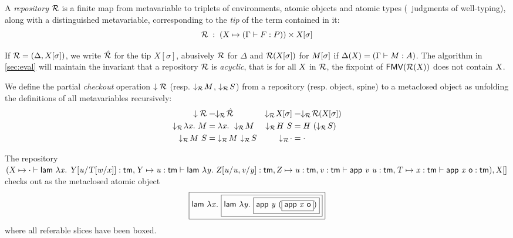 \documentclass{llncs}
\begin{document}


\begin{definition}
  A \emph{repository} $\mathcal{R}$ is a finite map from metavariable to
  triplets of environments, atomic objects and atomic types (\ie\
  judgments of well-typing), along with a distinguished metavariable,
  corresponding to the \emph{tip} of the term contained in it:
$$ \mathcal{R}\;:\;(\text{\textsl{X}} \mapsto (\Gamma\vdash{F}:{P}))\times{\ensuremath{\text{\textsl{X}}}}[{\sigma}] $$
\end{definition}

If $\mathcal{R} = (\Delta, X[\sigma])$, we write $\hat {\mathcal{R}}$ for the tip
$X[\sigma]$, abusively $\mathcal{R}$ for $\Delta$ and $\mathcal{R} ({\text{\textsl{X}}}[{\sigma}])$
for ${M}[{\sigma}]$ if $\Delta(\text{\textsl{X}}) = (\Gamma\vdash M : A)$.
The algorithm in \ref{sec:eval} will maintain the invariant that a
repository $\mathcal{R}$ is \emph{acyclic}, that is for all $\text{\textsl{X}}$ in
$\mathcal{R}$, the fixpoint of ${\text{\textsf{FMV}}}({\mathcal{R}(\text{\textsl{X}})})$ does not contain $\text{\textsl{X}}$.

\begin{definition}
  We define the partial \emph{checkout} operation $\downarrow{\mathcal{R}}$
  (resp. $\downarrow_{\mathcal{R}}\!{M}$, $\downarrow_{\mathcal{R}}\!{S}$) from a repository
  (resp. object, spine) to a metaclosed object as unfolding the
  definitions of all metavariables recursively:
  \begin{align*}
    \checkout{\mr} &= \checkoutr{\hat{\mr}} &
    \checkoutr{\smeta X \sigma} &= \checkoutr{\mr(\smeta X\sigma)}\\
    \checkoutr{\lam x M} &= \lam x \checkoutr{M} &
    \checkoutr{\app H S} &= \app H {(\checkoutr{S})} \\
    \checkoutr{\spinecons M S} &= \spinecons {\checkoutr M} {\checkoutr S} &
    \checkoutr{\spinenil} &= \spinenil
  \end{align*}
\end{definition}

\begin{example}
  The repository
$
(
\text{\textsl{X}} \mapsto
\cdot\vdash
{\ensuremath{\text{\textsf{lam}}}}\  \lambda{\ensuremath{\text{\textit{x}}}}.\  {\text{\textsl{Y}}}[{{\text{\textit{u}}}/{{\text{\textsl{T}}}[{{\text{\textit{w}}}/{x}}]}}] :
\text{\textsf{tm}},
\text{\textsl{Y}} \mapsto
{\ensuremath{\text{\textit{u}}}}:{\text{\textsf{tm}}} \vdash
{\ensuremath{\text{\textsf{lam}}}}\  \lambda{\ensuremath{\text{\textit{y}}}}.\  {\text{\textsl{Z}}}[{{{\text{\textit{u}}}/{\text{\textit{u}}}},{{\text{\textit{v}}}/{\text{\textit{y}}}} }] :
\text{\textsf{tm}}
,
\text{\textsl{Z}} \mapsto
{{\ensuremath{\text{\textit{u}}}}:{\ensuremath{\text{\textsf{tm}}}}},{{\text{\textit{v}}}:{\text{\textsf{tm}}}} \vdash
{{\ensuremath{\text{\textsf{app}}}}\ {\ensuremath{\text{\textit{v}}}}}\ {\text{\textit{u}}} :
\text{\textsf{tm}}
,
\text{\textsl{T}} \mapsto
{\ensuremath{\text{\textit{x}}}}:{\text{\textsf{tm}}} \vdash
{\ensuremath{\text{\textsf{app}}}}\ {\text{\textit{x}}}\ {\text{\textsf{o}}} :
\text{\textsf{tm}}
), {\text{\textsl{X}}}[{}]
$
checks out as the metaclosed atomic object
$$
\fbox{$
  {\text{\textsf{lam}}}\  \lambda{\ensuremath{\text{\textit{x}}}}.\ 
  \fbox{$
    {\text{\textsf{lam}}}\  \lambda{\ensuremath{\text{\textit{y}}}}.\ 
    \fbox{$
      {\text{\textsf{app}}}\  {\text{\textit{y}}}\ 
      (\fbox{$
        {\text{\textsf{app}}}\ {\text{\textit{x}}}\ {\text{\textsf{o}}}
      $})
    $}
  $}
$}
$$
where all referable slices have been boxed.
\end{example}
\end{document}
